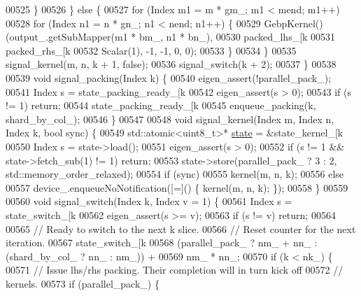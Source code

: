 \begin{DoxyCode}
00525         \}
00526       \} \textcolor{keywordflow}{else} \{
00527         \textcolor{keywordflow}{for} (Index m1 = m * gm\_; m1 < mend; m1++)
00528           \textcolor{keywordflow}{for} (Index n1 = n * gn\_; n1 < nend; n1++) \{
00529             GebpKernel()(output\_.getSubMapper(m1 * bm\_, n1 * bn\_),
00530                          packed\_lhs\_[k %
00531                          packed\_rhs\_[k %
00532                          Scalar(1), -1, -1, 0, 0);
00533           \}
00534       \}
00535       signal\_kernel(m, n, k + 1, \textcolor{keyword}{false});
00536       signal\_switch(k + 2);
00537     \}
00538 
00539     \textcolor{keywordtype}{void} signal\_packing(Index k) \{
00540       eigen\_assert(!parallel\_pack\_);
00541       Index s = state\_packing\_ready\_[k %
00542       eigen\_assert(s > 0);
00543       \textcolor{keywordflow}{if} (s != 1) \textcolor{keywordflow}{return};
00544       state\_packing\_ready\_[k %
00545       enqueue\_packing(k, shard\_by\_col\_);
00546     \}
00547 
00548     \textcolor{keywordtype}{void} signal\_kernel(Index m, Index n, Index k, \textcolor{keywordtype}{bool} sync) \{
00549       std::atomic<uint8\_t>* \hyperlink{structstate}{state} = &state\_kernel\_[k %
00550       Index s = state->load();
00551       eigen\_assert(s > 0);
00552       \textcolor{keywordflow}{if} (s != 1 && state->fetch\_sub(1) != 1) \textcolor{keywordflow}{return};
00553       state->store(parallel\_pack\_ ? 3 : 2, std::memory\_order\_relaxed);
00554       \textcolor{keywordflow}{if} (sync)
00555         kernel(m, n, k);
00556       \textcolor{keywordflow}{else}
00557         device\_.enqueueNoNotification([=]() \{ kernel(m, n, k); \});
00558     \}
00559 
00560     \textcolor{keywordtype}{void} signal\_switch(Index k, Index v = 1) \{
00561       Index s = state\_switch\_[k %
00562       eigen\_assert(s >= v);
00563       \textcolor{keywordflow}{if} (s != v) \textcolor{keywordflow}{return};
00564 
00565       \textcolor{comment}{// Ready to switch to the next k slice.}
00566       \textcolor{comment}{// Reset counter for the next iteration.}
00567       state\_switch\_[k %
00568           (parallel\_pack\_ ? nm\_ + nn\_ : (shard\_by\_col\_ ? nn\_ : nm\_)) +
00569           nm\_ * nn\_;
00570       \textcolor{keywordflow}{if} (k < nk\_) \{
00571         \textcolor{comment}{// Issue lhs/rhs packing. Their completion will in turn kick off}
00572         \textcolor{comment}{// kernels.}
00573         \textcolor{keywordflow}{if} (parallel\_pack\_) \{

\end{DoxyCode}
